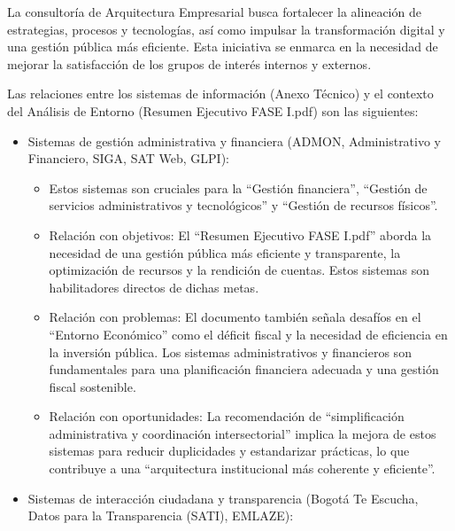 \documentclass[
	a4paper, %
	12pt, %
]{include/CSSullivanBusinessReport}
\def\tightlist{}
\begin{document}
La consultoría de Arquitectura Empresarial busca fortalecer la
alineación de estrategias, procesos y tecnologías, así como impulsar la
transformación digital y una gestión pública más eficiente. Esta
iniciativa se enmarca en la necesidad de mejorar la satisfacción de los
grupos de interés internos y externos.

Las relaciones entre los sistemas de información (Anexo Técnico) y el
contexto del Análisis de Entorno (Resumen Ejecutivo FASE I.pdf) son las
siguientes:

\begin{itemize}
\tightlist
\item
  Sistemas de gestión administrativa y financiera (ADMON, Administrativo
  y Financiero, SIGA, SAT Web, GLPI):

  \begin{itemize}
  \tightlist
  \item
    Estos sistemas son cruciales para la ``Gestión financiera'',
    ``Gestión de servicios administrativos y tecnológicos'' y ``Gestión
    de recursos físicos''.
  \item
    Relación con objetivos: El ``Resumen Ejecutivo FASE I.pdf'' aborda
    la necesidad de una gestión pública más eficiente y transparente, la
    optimización de recursos y la rendición de cuentas. Estos sistemas
    son habilitadores directos de dichas metas.
  \item
    Relación con problemas: El documento también señala desafíos en el
    ``Entorno Económico'' como el déficit fiscal y la necesidad de
    eficiencia en la inversión pública. Los sistemas administrativos y
    financieros son fundamentales para una planificación financiera
    adecuada y una gestión fiscal sostenible.
  \item
    Relación con oportunidades: La recomendación de ``simplificación
    administrativa y coordinación intersectorial'' implica la mejora de
    estos sistemas para reducir duplicidades y estandarizar prácticas,
    lo que contribuye a una ``arquitectura institucional más coherente y
    eficiente''.
  \end{itemize}
\item
  Sistemas de interacción ciudadana y transparencia (Bogotá Te Escucha,
  Datos para la Transparencia (SATI), EMLAZE):


\end{itemize}
\end{document}
